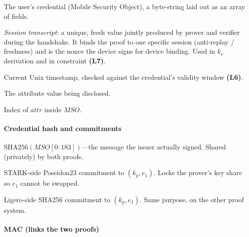 \documentclass{article}
\newcommand{\SHA}{\mathrm{SHA256}}
\begin{document}
\begin{description}[leftmargin=3.5em, labelwidth=3em, style=sameline, itemsep=2pt]
  \item[$MSO$]   The user's credential (Mobile Security Object), a byte-string
                 laid out as an array of fields.
  \item[$tr$]    \emph{Session transcript}: a unique, fresh value jointly produced
                 by prover and verifier during the handshake. It binds the proof to
                 one specific session (anti-replay / freshness) and is the nonce the
                 device signs for device binding. Used in $k_v$ derivation and in
                 constraint \textbf{(L7)}.
  \item[$now$]   Current Unix timestamp, checked against the credential's validity
                 window \textbf{(L6)}.
  \item[$attr$]  The attribute value being disclosed.
  \item[$id$]    Index of $attr$ inside $MSO$.
\end{description}

\paragraph*{Credential hash and commitments}

\begin{description}[leftmargin=3.5em, labelwidth=3em, style=sameline, itemsep=2pt]
  \item[$e_1$]   $\SHA(MSO[0:183])$---the message the issuer actually signed.
                 Shared (privately) by both proofs.
  \item[$R_S$]   STARK-side Poseidon23 commitment to $(k_p,e_1)$. Locks the
                 prover's key share so $e_1$ cannot be swapped.
  \item[$R_L$]   Ligero-side SHA256 commitment to $(k_p,e_1)$. Same purpose,
                 on the other proof system.
\end{description}

\paragraph*{MAC (links the two proofs)}
\end{document}
